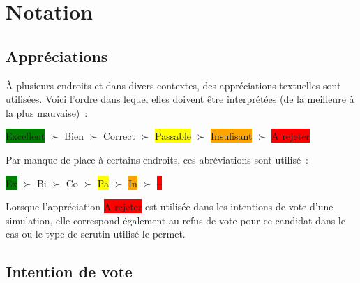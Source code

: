 \documentclass[../report]{subfiles}
\begin{document}
  \section{Notation}
  
  \subsection{Appréciations}
  
  À plusieurs endroits et dans divers contextes, des appréciations textuelles sont utilisées. 
  Voici l'ordre dans lequel elles doivent être interprétées (de la meilleure à la plus mauvaise)~:
  
  \begin{center}
  	\colorbox{green}{Excellent} $\succ$
  	\colorbox{green!50!yellow}{Bien} $\succ$
  	\colorbox{green!25!yellow}{Correct} $\succ$
  	\colorbox{yellow}{Passable} $\succ$
  	\colorbox{orange}{Insufisant} $\succ$
  	\colorbox{red}{A rejeter}
  \end{center}

  Par manque de place à certains endroits, ces abréviations sont utilisé~:

  \begin{center}
	\colorbox{green}{Ex} $\succ$
	\colorbox{green!50!yellow}{Bi} $\succ$
	\colorbox{green!25!yellow}{Co} $\succ$
	\colorbox{yellow}{Pa} $\succ$
	\colorbox{orange}{In} $\succ$
	\colorbox{red}{--}
  \end{center}

  Lorsque l'appréciation \colorbox{red}{A rejeter} est utilisée dans les intentions de vote d'une simulation, 
  elle correspond également au refus de vote pour ce candidat dans le cas ou le type de scrutin utilisé le permet.
  
  \subsection{Intention de vote}
  
\end{document}

